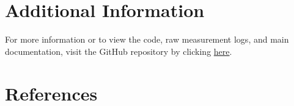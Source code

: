 \documentclass[10pt, a4paper, twocolumn]{article}
\begin{document}
	\section{Additional Information}
	For more information or to view the code, raw measurement logs, and main documentation, visit the GitHub repository by clicking \href{https://github.com/ChrisTekam/thermobox}{here}.
	
	\section*{References}
	\printbibliography[heading=none]
	
\end{document}
